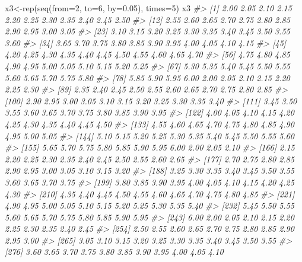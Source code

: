 \documentclass[
]{book}
\newenvironment{Shaded}{\begin{snugshade}}{\end{snugshade}}
\newcommand{\AttributeTok}[1]{\textcolor[rgb]{0.77,0.63,0.00}{#1}}
\newcommand{\CommentTok}[1]{\textcolor[rgb]{0.56,0.35,0.01}{\textit{#1}}}
\newcommand{\DecValTok}[1]{\textcolor[rgb]{0.00,0.00,0.81}{#1}}
\newcommand{\FloatTok}[1]{\textcolor[rgb]{0.00,0.00,0.81}{#1}}
\newcommand{\FunctionTok}[1]{\textcolor[rgb]{0.00,0.00,0.00}{#1}}
\newcommand{\NormalTok}[1]{#1}
\newcommand{\OtherTok}[1]{\textcolor[rgb]{0.56,0.35,0.01}{#1}}
\begin{document}
\begin{Shaded}
\begin{Highlighting}[]
\NormalTok{x3}\OtherTok{\textless{}{-}}\FunctionTok{rep}\NormalTok{(}\FunctionTok{seq}\NormalTok{(}\AttributeTok{from=}\DecValTok{2}\NormalTok{, }\AttributeTok{to=}\DecValTok{6}\NormalTok{, }\AttributeTok{by=}\FloatTok{0.05}\NormalTok{), }\AttributeTok{times=}\DecValTok{5}\NormalTok{)}
\NormalTok{x3}
\CommentTok{\#\textgreater{}   [1] 2.00 2.05 2.10 2.15 2.20 2.25 2.30 2.35 2.40 2.45 2.50}
\CommentTok{\#\textgreater{}  [12] 2.55 2.60 2.65 2.70 2.75 2.80 2.85 2.90 2.95 3.00 3.05}
\CommentTok{\#\textgreater{}  [23] 3.10 3.15 3.20 3.25 3.30 3.35 3.40 3.45 3.50 3.55 3.60}
\CommentTok{\#\textgreater{}  [34] 3.65 3.70 3.75 3.80 3.85 3.90 3.95 4.00 4.05 4.10 4.15}
\CommentTok{\#\textgreater{}  [45] 4.20 4.25 4.30 4.35 4.40 4.45 4.50 4.55 4.60 4.65 4.70}
\CommentTok{\#\textgreater{}  [56] 4.75 4.80 4.85 4.90 4.95 5.00 5.05 5.10 5.15 5.20 5.25}
\CommentTok{\#\textgreater{}  [67] 5.30 5.35 5.40 5.45 5.50 5.55 5.60 5.65 5.70 5.75 5.80}
\CommentTok{\#\textgreater{}  [78] 5.85 5.90 5.95 6.00 2.00 2.05 2.10 2.15 2.20 2.25 2.30}
\CommentTok{\#\textgreater{}  [89] 2.35 2.40 2.45 2.50 2.55 2.60 2.65 2.70 2.75 2.80 2.85}
\CommentTok{\#\textgreater{} [100] 2.90 2.95 3.00 3.05 3.10 3.15 3.20 3.25 3.30 3.35 3.40}
\CommentTok{\#\textgreater{} [111] 3.45 3.50 3.55 3.60 3.65 3.70 3.75 3.80 3.85 3.90 3.95}
\CommentTok{\#\textgreater{} [122] 4.00 4.05 4.10 4.15 4.20 4.25 4.30 4.35 4.40 4.45 4.50}
\CommentTok{\#\textgreater{} [133] 4.55 4.60 4.65 4.70 4.75 4.80 4.85 4.90 4.95 5.00 5.05}
\CommentTok{\#\textgreater{} [144] 5.10 5.15 5.20 5.25 5.30 5.35 5.40 5.45 5.50 5.55 5.60}
\CommentTok{\#\textgreater{} [155] 5.65 5.70 5.75 5.80 5.85 5.90 5.95 6.00 2.00 2.05 2.10}
\CommentTok{\#\textgreater{} [166] 2.15 2.20 2.25 2.30 2.35 2.40 2.45 2.50 2.55 2.60 2.65}
\CommentTok{\#\textgreater{} [177] 2.70 2.75 2.80 2.85 2.90 2.95 3.00 3.05 3.10 3.15 3.20}
\CommentTok{\#\textgreater{} [188] 3.25 3.30 3.35 3.40 3.45 3.50 3.55 3.60 3.65 3.70 3.75}
\CommentTok{\#\textgreater{} [199] 3.80 3.85 3.90 3.95 4.00 4.05 4.10 4.15 4.20 4.25 4.30}
\CommentTok{\#\textgreater{} [210] 4.35 4.40 4.45 4.50 4.55 4.60 4.65 4.70 4.75 4.80 4.85}
\CommentTok{\#\textgreater{} [221] 4.90 4.95 5.00 5.05 5.10 5.15 5.20 5.25 5.30 5.35 5.40}
\CommentTok{\#\textgreater{} [232] 5.45 5.50 5.55 5.60 5.65 5.70 5.75 5.80 5.85 5.90 5.95}
\CommentTok{\#\textgreater{} [243] 6.00 2.00 2.05 2.10 2.15 2.20 2.25 2.30 2.35 2.40 2.45}
\CommentTok{\#\textgreater{} [254] 2.50 2.55 2.60 2.65 2.70 2.75 2.80 2.85 2.90 2.95 3.00}
\CommentTok{\#\textgreater{} [265] 3.05 3.10 3.15 3.20 3.25 3.30 3.35 3.40 3.45 3.50 3.55}
\CommentTok{\#\textgreater{} [276] 3.60 3.65 3.70 3.75 3.80 3.85 3.90 3.95 4.00 4.05 4.10}

\end{Highlighting}
\end{Shaded}
\end{document}
